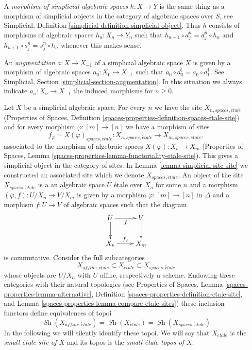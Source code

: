 \documentclass{stacks-project}
\theoremstyle{plain}
\theoremstyle{definition}
\theoremstyle{remark}
\numberwithin{equation}{subsection}
\def\Sh{\mathop{\mathit{Sh}}\nolimits}
\def\etale{{\acute{e}tale}}
\begin{document}
\medskip\noindent
A {\it morphism of simplicial algebraic spaces} $h : X \to Y$ is the same
thing as a morphism of simplicial objects in
the category of algebraic spaces over $S$,
see Simplicial, Definition \ref{simplicial-definition-simplicial-object}.
Thus $h$ consists of morphisms of algebraic spaces $h_n : X_n \to Y_n$
such that $h_{n - 1} \circ d^n_j = d^n_j \circ h_n$ and
$h_{n + 1} \circ s^n_j = s^n_j \circ h_n$ whenever this makes sense.

\medskip\noindent
An {\it augmentation} $a : X \to X_{-1}$
of a simplicial algebraic space $X$ is given by a morphism
of algebraic spaces $a_0 : X_0 \to X_{-1}$
such that $a_0 \circ d^1_0 = a_0 \circ d^1_1$.
See Simplicial, Section \ref{simplicial-section-augmentation}.
In this situation we always indicate $a_n : X_n \to X_{-1}$ the induced
morphisms for $n \geq 0$.

\medskip\noindent
Let $X$ be a simplicial algebraic space. For every $n$ we have the
site $X_{n, spaces, \etale}$ (Properties of Spaces, Definition
\ref{spaces-properties-definition-spaces-etale-site})
and for every morphism $\varphi : [m] \to [n]$ we have a morphism of sites
$$
f_\varphi = X(\varphi)_{spaces, \etale} :
X_{n, spaces, \etale} \to X_{m, spaces, \etale},
$$
associated to the morphism of algebraic spaces
$X(\varphi) : X_n \to X_m$ (Properties of Spaces, Lemma
\ref{spaces-properties-lemma-functoriality-etale-site}).
This gives a simplicial object in the category of sites.
In Lemma \ref{lemma-simplicial-site-site} we constructed an associated
site which we denote $X_{spaces, \etale}$.
An object of the site $X_{spaces, \etale}$ is a
an algebraic space $U$ \'etale over $X_n$ for some $n$
and a morphism $(\varphi, f) : U/X_n \to V/X_m$ is given
by a morphism $\varphi : [m] \to [n]$ in $\Delta$ and a morphism
$f : U \to V$ of algebraic spaces such that the diagram
$$
\xymatrix{
U \ar[r]_f \ar[d] & V \ar[d] \\
X_n \ar[r]^{f_\varphi} & X_m
}
$$
is commutative. Consider the full subcategories
$$
X_{affine, \etale} \subset X_\etale \subset X_{spaces, \etale}
$$
whose objects are $U/X_n$ with $U$ affine, respectively a scheme.
Endowing these categories with their natural topologies
(see
Properties of Spaces, Lemma \ref{spaces-properties-lemma-alternative},
Definition \ref{spaces-properties-definition-etale-site}, and
Lemma \ref{spaces-properties-lemma-compare-etale-sites})
these inclusion functors define equivalences of topoi
$$
\Sh(X_{affine, \etale}) = \Sh(X_\etale) = \Sh(X_{spaces, \etale})
$$
In the following we will silently identify these topoi.
We will say that $X_\etale$ is the {\it small \'etale site of $X$}
and its topos is the {\it small \'etale topos of $X$}.
\end{document}
